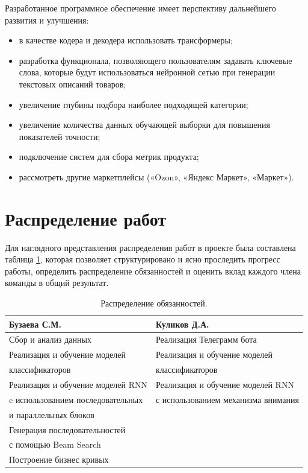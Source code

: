 \documentclass[a4paper,12pt]{extarticle}
\begin{document}
Разработанное программное обеспечение имеет перспективу дальнейшего развития и улучшения:
\begin{itemize}
	\item в качестве кодера и декодера использовать трансформеры;
	\item разработка функционала, позволяющего пользователям задавать ключевые слова, которые будут использоваться нейронной сетью при генерации текстовых описаний товаров;
	\item увеличение глубины подбора наиболее подходящей категории;
	\item увеличение количества данных обучающей выборки для повышения показателей точности;
	\item подключение систем для сбора метрик продукта;
	\item рассмотреть другие маркетплейсы («Ozon», «Яндекс Маркет», «Маркет»).
\end{itemize}

\newpage
\section*{Распределение работ}

Для наглядного представления распределения работ в проекте была составлена таблица \ref{work}, которая позволяет структурировано и ясно проследить прогресс работы, определить распределение обязанностей и оценить вклад каждого члена команды в общий результат.

\begin{table}[h]
	\centering
	\begin{tabular}{ |l|l| } 
		\hline
		\textbf{Бузаева С.М.} & \textbf{Куликов Д.А.}  \\ \hline
		Сбор и анализ данных & Реализация Телеграмм бота \\ \hline
		Реализация и обучение моделей  & Реализация и обучение моделей  \\ 
		классификаторов  & классификаторов  \\ \hline
		Реализация и обучение моделей RNN & Реализация и обучение моделей RNN \\
		c использованием последовательных & с использованием механизма внимания \\
		и параллельных блоков &  \\ \hline
		Генерация последовательностей &  \\ 
		с помощью Beam Search  &  \\ \hline
		Построение бизнес кривых  &  \\  
		\hline
	\end{tabular}
	\caption{Распределение обязанностей.}
	\label{work}
\end{table}
\end{document}
